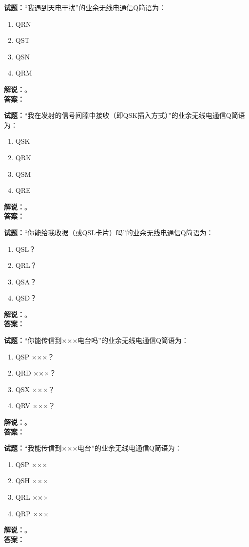 \documentclass{ctexbook}
\begin{document}
\bigskip

\noindent\textbf{试题：}“我遇到天电干扰”的业余无线电通信Q简语为：
\begin{enumerate}[leftmargin=3em]
  \item QRN
  \item QST
  \item QSN
  \item QRM
\end{enumerate}
\noindent\textbf{解说：}\textbf{}。\\\noindent\textbf{答案：}

\bigskip

\noindent\textbf{试题：}“我在发射的信号间隙中接收（即QSK插入方式）”的业余无线电通信Q简语为：
\begin{enumerate}[leftmargin=3em]
  \item QSK
  \item QRK
  \item QSM
  \item QRE
\end{enumerate}
\noindent\textbf{解说：}\textbf{}。\\\noindent\textbf{答案：}

\bigskip

\noindent\textbf{试题：}“你能给我收据（或QSL卡片）吗”的业余无线电通信Q简语为：
\begin{enumerate}[leftmargin=3em]
  \item QSL？
  \item QRL？
  \item QSA？
  \item QSD？
\end{enumerate}
\noindent\textbf{解说：}\textbf{}。\\\noindent\textbf{答案：}

\bigskip

\noindent\textbf{试题：}“你能传信到×××电台吗”的业余无线电通信Q简语为：
\begin{enumerate}[leftmargin=3em]
  \item QSP ×××？
  \item QRD ×××？
  \item QSX ×××？
  \item QRV ×××？
\end{enumerate}
\noindent\textbf{解说：}\textbf{}。\\\noindent\textbf{答案：}

\bigskip

\noindent\textbf{试题：}“我能传信到×××电台”的业余无线电通信Q简语为：
\begin{enumerate}[leftmargin=3em]
  \item QSP ×××
  \item QSH ×××
  \item QRL ×××
  \item QRP ×××
\end{enumerate}
\noindent\textbf{解说：}\textbf{}。\\\noindent\textbf{答案：}
\end{document}

